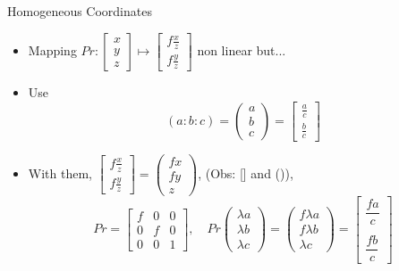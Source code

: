 \documentclass[9pt]{beamer}
\newcommand{\myemph}[1]{{\color{blue}{#1}}}
\begin{document}
\begin{frame}[t]{Homogeneous Coordinates}
  \begin{itemize}
  \item Mapping $Pr:\begin{bmatrix}x \\ y \\ z\end{bmatrix} \mapsto\begin{bmatrix}f\frac{x}{z}\\f\frac{y}{z}\end{bmatrix}$ non linear but...
  \item Use \myemph{Homogeneous Coordinates}
    $$
    \left(a:b:c\right) =
      \begin{pmatrix}
        a\\b\\c
      \end{pmatrix}
      =
      \begin{bmatrix}
        \frac{a}{c}\\\frac{b}{c}
      \end{bmatrix}
    $$
    \item With them, $\begin{bmatrix}f\frac{x}{z}\\f\frac{y}{z}\end{bmatrix} =
      \begin{pmatrix}
        fx\\fy\\z
      \end{pmatrix}$, (Obs: [] and ()), 
      $$
      Pr=
      \begin{bmatrix}
        f & 0 & 0\\
        0 & f & 0\\
        0 & 0 & 1
      \end{bmatrix},\quad
      Pr
      \begin{pmatrix}
        \lambda a\\\lambda b\\\lambda c
      \end{pmatrix}
      =
      \begin{pmatrix}
        f \lambda a\\ f\lambda b\\\lambda c
      \end{pmatrix}
      =
      \begin{bmatrix}
        \dfrac{fa}{c}\\~\\\dfrac{fb}{c}
      \end{bmatrix}
      $$
  \end{itemize}
  
\end{frame}
\end{document}
